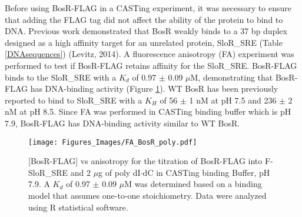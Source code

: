 \documentclass[12pt,twoside]{reedthesis}
\begin{document}
    Before using BosR-FLAG in a CASTing experiment, it was necessary to ensure that adding the FLAG tag did not affect the ability of the protein to bind to DNA. Previous work demonstrated that BosR weakly binds to a 37 bp duplex designed as a high affinity target for an unrelated protein, SloR\_SRE (Table \ref{DNAsequences}) (Levitz, 2014). A fluorescence anisotropy (FA) experiment was performed to test if BosR-FLAG retains affinity for the SloR\_SRE. BosR-FLAG binds to the SloR\_SRE with a $K_{d}$ of 0.97 $\pm$ 0.09 $\mu$M, demonstrating that BosR-FLAG has DNA-binding activity (Figure \ref{BosRFLAGFApoly}). WT BosR has been previously reported to bind to SloR\_SRE with a $K_{H}$ of 56 $\pm$ 1 nM at pH 7.5 and 236 $\pm$ 2 nM at pH 8.5. Since FA was performed in CASTing binding buffer which is pH 7.9, BosR-FLAG has DNA-binding activity similar to WT BosR.  
      \begin{figure}[h]
      	\centering
      	\texttt{[image: Figures\_Images/FA\_BosR\_poly.pdf]}
      	\caption[Determining Activity of BosR-FLAG by Fluorescence Anistropy]{[BosR-FLAG] vs anisotropy for the titration of BosR-FLAG into F-SloR\_SRE and 2 $\mu$g of poly dI$\cdot$dC in CASTing binding Buffer, pH 7.9. A $K_{d}$ of 0.97 $\pm$ 0.09 $\mu$M was determined based on a binding model that assumes one-to-one stoichiometry. Data were analyzed using R statistical software.}
      	\label{BosRFLAGFApoly}
      \end{figure}
      
      \clearpage
      
    
\end{document}

